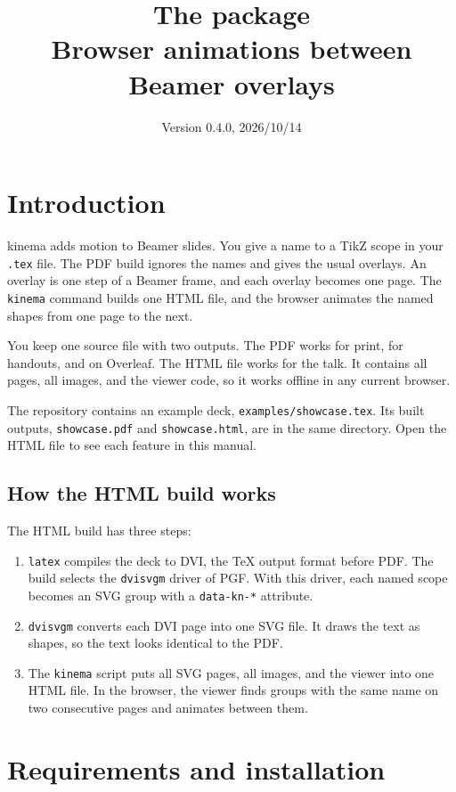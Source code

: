 \documentclass[11pt]{article}
\title{The \pkg{} package\\[0.3em]\large Browser animations between Beamer overlays}
\date{Version 0.4.0, 2026/10/14}
\newcommand{\pkg}{\textsf{kinema}}
\newcommand{\cmd}[1]{\texttt{#1}}
\begin{document}
\maketitle
\tableofcontents

\section{Introduction}

\pkg{} adds motion to Beamer slides. You give a name to a TikZ scope in your
\cmd{.tex} file. The PDF build ignores the names and gives the usual overlays.
An overlay is one step of a Beamer frame, and each overlay becomes one page. The
\cmd{kinema} command builds one HTML file, and the browser animates the named
shapes from one page to the next.

You keep one source file with two outputs. The PDF works for print, for handouts,
and on Overleaf. The HTML file works for the talk. It contains all pages, all
images, and the viewer code, so it works offline in any current browser.

The repository contains an example deck, \cmd{examples/showcase.tex}. Its built
outputs, \cmd{showcase.pdf} and \cmd{showcase.html}, are in the same directory.
Open the HTML file to see each feature in this manual.

\subsection{How the HTML build works}

The HTML build has three steps:
\begin{enumerate}
	\item \cmd{latex} compiles the deck to DVI, the TeX output format before PDF.
	      The build selects the \cmd{dvisvgm} driver of PGF. With this driver, each
	      named scope becomes an SVG group with a \cmd{data-kn-*} attribute.
	\item \cmd{dvisvgm} converts each DVI page into one SVG file. It draws the text
	      as shapes, so the text looks identical to the PDF.
	\item The \cmd{kinema} script puts all SVG pages, all images, and the viewer
	      into one HTML file. In the browser, the viewer finds groups with the same name
	      on two consecutive pages and animates between them.
\end{enumerate}

\section{Requirements and installation}
\end{document}
